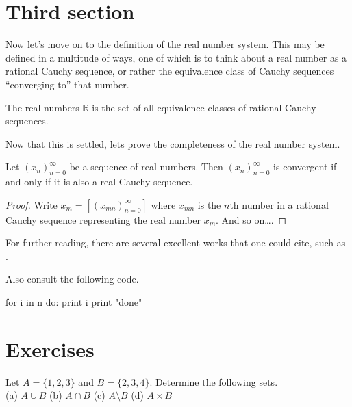 \documentclass{tstextbook}
\begin{document}
\section{Third section}

Now let's move on to the definition of the real number system. This
may be defined in a multitude of ways, one of which is to think about
a real number as a rational Cauchy sequence, or rather the equivalence
class of Cauchy sequences ``converging to'' that number.

\begin{definition}
  \label{def:realnumbers}
  The real numbers $\mathbb{R}$ is the set of all equivalence classes
  of rational Cauchy sequences.
\end{definition}

Now that this is settled, lets prove the completeness of the real
number system.

\begin{theorem}
  \label{th:realnumberscomplete}
  Let $(x_n)_{n=0}^{\infty}$ be a sequence of real numbers.
  Then $(x_n)_{n=0}^{\infty}$ is convergent if and only if
  it is also a real Cauchy sequence.
  \end{theorem}
\begin{proof}
  Write $x_m = [(x_{mn})_{n=0}^{\infty}]$ where
  $x_{mn}$ is the $n$th number in a rational Cauchy sequence
  representing the real number $x_m$. And so on\ldots.
\end{proof}

For further reading, there are several excellent works that one could
cite, such as \cite{Tao2006,Turing1936}.

Also consult the following code.
\begin{programming}
for i in n do:
    print i
print "done"
\end{programming}

\section*{Exercises}

\begin{exercise}
  Let $A = \{1, 2, 3\}$ and $B = \{2, 3, 4\}$.
  Determine the following sets. \\
  (a) $A \cup B$ \quad
  (b) $A \cap B$ \quad
  (c) $A \setminus B$ \quad
  (d) $A \times B$
\end{exercise}
\end{document}
